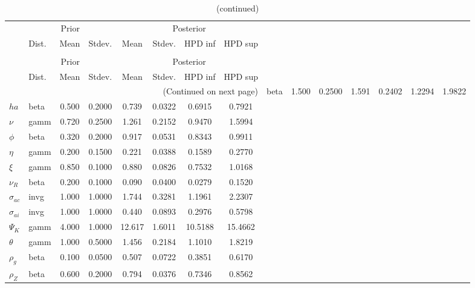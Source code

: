  
\begin{center}
\begin{longtable}{llcccccc} 
\caption{Results from Metropolis-Hastings (parameters)}
 \label{Table:MHPosterior:1}\\
\toprule 
  & \multicolumn{3}{c}{Prior}  &  \multicolumn{4}{c}{Posterior} \\
  \cmidrule(r{.75em}){2-4} \cmidrule(r{.75em}){5-8}
  & Dist. & Mean  & Stdev. & Mean & Stdev. & HPD inf & HPD sup\\
\midrule \endfirsthead 
\caption{(continued)}\\\toprule 
  & \multicolumn{3}{c}{Prior}  &  \multicolumn{4}{c}{Posterior} \\
  \cmidrule(r{.75em}){2-4} \cmidrule(r{.75em}){5-8}
  & Dist. & Mean  & Stdev. & Mean & Stdev. & HPD inf & HPD sup\\
\midrule \endhead 
\bottomrule \multicolumn{8}{r}{(Continued on next page)} \endfoot 
\bottomrule \endlastfoot 
${\sigma}$ & beta &   1.500 & 0.2500 &   1.591& 0.2402 &  1.2294 &  1.9822 \\ 
${ha}$ & beta &   0.500 & 0.2000 &   0.739& 0.0322 &  0.6915 &  0.7921 \\ 
$\nu$ & gamm &   0.720 & 0.2500 &   1.261& 0.2152 &  0.9470 &  1.5994 \\ 
${\phi}$ & beta &   0.320 & 0.2000 &   0.917& 0.0531 &  0.8343 &  0.9911 \\ 
${\eta}$ & gamm &   0.200 & 0.1500 &   0.221& 0.0388 &  0.1589 &  0.2770 \\ 
$\xi$ & gamm &   0.850 & 0.1000 &   0.880& 0.0826 &  0.7532 &  1.0168 \\ 
${\nu_R}$ & beta &   0.200 & 0.1000 &   0.090& 0.0400 &  0.0279 &  0.1520 \\ 
${\sigma_{ac}}$ & invg &   1.000 & 1.0000 &   1.744& 0.3281 &  1.1961 &  2.2307 \\ 
${\sigma_{ai}}$ & invg &   1.000 & 1.0000 &   0.440& 0.0893 &  0.2976 &  0.5798 \\ 
${\Psi_{K}}$ & gamm &   4.000 & 1.0000 &  12.617& 1.6011 & 10.5188 & 15.4662 \\ 
${\theta}$ & gamm &   1.000 & 0.5000 &   1.456& 0.2184 &  1.1010 &  1.8219 \\ 
${\rho_g}$ & beta &   0.100 & 0.0500 &   0.507& 0.0722 &  0.3851 &  0.6170 \\ 
${\rho_Z}$ & beta &   0.600 & 0.2000 &   0.794& 0.0376 &  0.7346 &  0.8562 \\ 

\end{longtable}
\end{center}
